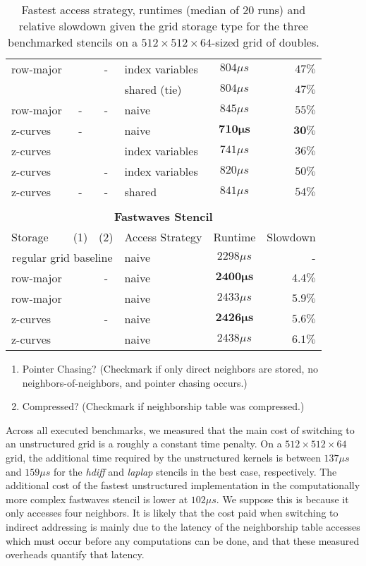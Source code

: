 \begin{table}
\begin{tabular}{l c c l c r}
		 row-major & \checkmark & - & index variables & $804\mu s$ & $47\%$ \\
		 &   & &  shared (tie) & $804\mu s$ & $47\%$ \\
		 row-major & - & - & naive & $845 \mu s$ & $55 \%$ \\
		\hline
		 z-curves & - & \checkmark & naive & $\mathbf{710 \mu s}$ & $\mathbf{30 \%}$ \\
		 z-curves & \checkmark & \checkmark & index variables & $741 \mu s$ & $36 \%$ \\
		 z-curves & \checkmark & - & index variables & $820\mu s$ &  $50 \%$ \\
		 z-curves & - & - & shared & $841 \mu s$ & $54 \%$ \\
		
		\hline
		\hline\\
		\multicolumn{6}{c}{\textbf{Fastwaves Stencil}}\\
		\hline
		\hline
		Storage & (1) & (2) & Access Strategy  & Runtime & Slowdown \\
		\hline
		\multicolumn{3}{c}{regular grid baseline} & naive & $2298 \mu s$ & - \\
		\hline
		row-major & & - & naive & $\mathbf{2400\mu s}$ & $\mathbf{4.4 \%}$ \\
		row-major & & \checkmark & naive & $2433\mu s$ & $5.9 \%$ \\
		\hline
		z-curves & & - & naive & $\mathbf{2426\mu s}$ & $\mathbf{5.6 \%}$ \\
		z-curves & & \checkmark & naive & $2438\mu s$ & $6.1 \%$ \\
		\hline\hline
	\end{tabular}
	\begin{enumerate}[label=(\arabic*)]
		\item Pointer Chasing? (Checkmark if only direct neighbors are stored, no neighbors-of-neighbors, and pointer chasing occurs.)
		\item Compressed? (Checkmark if neighborship table was compressed.)
	\end{enumerate}
	\caption{\label{tab:overview} Fastest access strategy, runtimes (median of 20 runs) and relative slowdown given the grid storage type for the three benchmarked stencils on a $512\times 512\times 64$-sized grid of doubles.}
\end{table}

Across all executed benchmarks, we measured that the main cost of switching to an unstructured grid is a roughly a constant time penalty. On a $512\times 512\times 64$ grid, the additional time required by the unstructured kernels is between $137 \mu s$ and $159 \mu s$ for the \emph{hdiff} and \emph{laplap} stencils in the best case, respectively. The additional cost of the fastest unstructured implementation in the computationally more complex fastwaves stencil is lower at $102 \mu s$. We suppose this is because it only accesses four neighbors. It is likely that the cost paid when switching to indirect addressing is mainly due to the latency of the neighborship table accesses which must occur before any computations can be done, and that these measured overheads quantify that latency.

